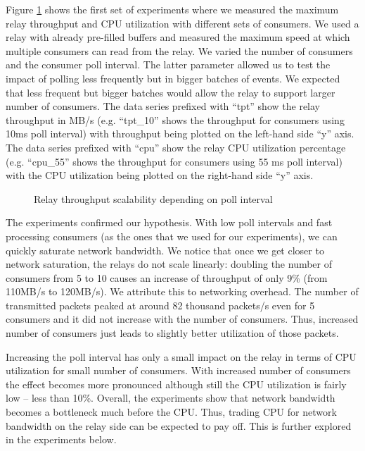 Figure \ref{fig:relay_throughput} shows the first set of experiments where we measured the maximum relay throughput and CPU utilization with different sets of consumers. We used a relay with already pre-filled buffers and measured the maximum speed at which multiple consumers can read from the relay. We varied the number of consumers and the consumer poll interval. The latter parameter allowed us to test the impact of polling less frequently but in bigger batches of events. We expected that less frequent but bigger batches would allow the relay to support larger number of consumers. The data series prefixed with ``tpt'' show the relay throughput in MB/s (e.g. ``tpt\_10'' shows the throughput for consumers using 10ms poll interval) with throughput being plotted on the left-hand side ``y'' axis. The data series prefixed with ``cpu'' show the relay CPU utilization percentage (e.g. ``cpu\_55'' shows the throughput for consumers using 55 ms poll interval) with the CPU utilization being plotted on the right-hand side ``y'' axis.

\begin{figure}
\centering
{}
\caption{Relay throughput scalability depending on poll interval}
\label{fig:relay_throughput}
\end{figure}

The experiments confirmed our hypothesis. With low poll intervals and fast processing consumers (as the ones that we used for our experiments), we can quickly saturate network bandwidth. We notice that once we get closer to network saturation, the relays do not scale linearly: doubling the number of consumers from 5 to 10 causes an increase of throughput of only 9\% (from 110MB/s to 120MB/s). We attribute this to networking overhead. The number of transmitted packets peaked at around 82 thousand packets/s even for 5 consumers and it did not increase with the number of consumers. Thus, increased number of consumers just leads to slightly better utilization of those packets.

Increasing the poll interval has only a small impact on the relay in terms of CPU utilization for small number of consumers. With increased number of consumers the effect becomes more pronounced although still the CPU utilization is fairly low -- less than 10\%. Overall, the experiments show that network bandwidth becomes a bottleneck much before the CPU. Thus, trading CPU for network bandwidth on the relay side can be expected to pay off. This is further explored in the experiments below.

